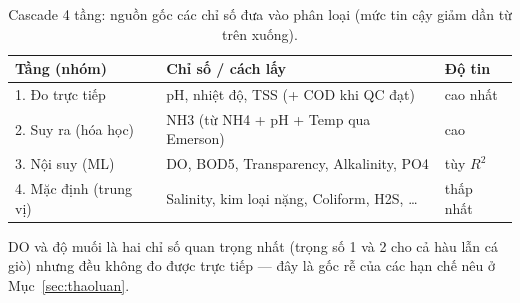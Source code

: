 \begin{table}[h]
\centering\small
\caption{Cascade 4 tầng: nguồn gốc các chỉ số đưa vào phân loại (mức tin cậy giảm dần từ trên xuống).}
\label{tab:gap}
\begin{tabular}{lll}
\toprule
\textbf{Tầng (nhóm)} & \textbf{Chỉ số / cách lấy} & \textbf{Độ tin} \\
\midrule
1. Đo trực tiếp & pH, nhiệt độ, TSS (+ COD khi QC đạt) & cao nhất \\
2. Suy ra (hóa học) & NH3 (từ NH4 + pH + Temp qua Emerson) & cao \\
3. Nội suy (ML) & DO, BOD5, Transparency, Alkalinity, PO4 & tùy $R^2$ \\
4. Mặc định (trung vị) & Salinity, kim loại nặng, Coliform, H2S, \dots & thấp nhất \\
\bottomrule
\end{tabular}
\end{table}

DO và độ muối là hai chỉ số quan trọng nhất (trọng số 1 và 2 cho cả hàu lẫn cá giò) nhưng đều không đo được trực tiếp --- đây là gốc rễ của các hạn chế nêu ở Mục~\ref{sec:thaoluan}.
